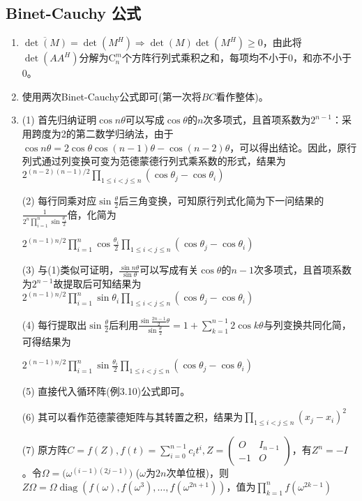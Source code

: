\documentclass[a4paper,UTF8,fontset=windows]{ctexart}
\DeclareMathOperator{\diag}{diag}
\begin{document}
\subsection{Binet-Cauchy 公式}
\begin{enumerate}
\item
$\overline{\det(M)}=\det(M^H)\Rightarrow\det(M)\det(M^H)\ge0$，由此将$\det(AA^H)$分解为$\mathrm{C}_n^m$个方阵行列式乘积之和，每项均不小于0，和亦不小于0。

\item
使用两次Binet-Cauchy公式即可(第一次将$BC$看作整体)。

\item
(1) 首先归纳证明$\cos{n\theta}$可以写成$\cos{\theta}$的$n$次多项式，且首项系数为$2^{n-1}$：采用跨度为2的第二数学归纳法，由于$\cos{n\theta}=2\cos{\theta}\cos{(n-1)\theta}-\cos{(n-2)\theta}$，可以得出结论。因此，原行列式通过列变换可变为范德蒙德行列式乘系数的形式，结果为$2^{(n-2)(n-1)/2}\prod_{1\le i<j\le n}(\cos{\theta_j}-\cos{\theta_i})$

(2) 每行同乘对应$\sin{\frac{\theta}{2}}$后三角变换，可知原行列式化简为下一问结果的$\frac{1}{2^n\prod_{i=1}^{n}\sin{\frac{\theta_i}{2}}}$倍，化简为

$2^{(n-1)n/2}\prod_{i=1}^{n}\cos{\frac{\theta_i}{2}}\prod_{1\le i<j\le n}(\cos{\theta_j}-\cos{\theta_i})$

(3) 与(1)类似可证明，$\frac{\sin{n\theta}}{\sin{\theta}}$可以写成有关$\cos{\theta}$的$n-1$次多项式，且首项系数为$2^{n-1}$故提取后可知结果为$2^{(n-1)n/2}\prod_{i=1}^{n}\sin{\theta_i}\prod_{1\le i<j\le n}(\cos{\theta_j}-\cos{\theta_i})$

(4) 每行提取出$\sin{\frac{\theta}{2}}$后利用$\frac{\sin{\frac{2n-1}{2}\theta}}{\sin{\frac{\theta}{2}}}=1+\sum_{k=1}^{n-1}{2\cos{k\theta}}$与列变换共同化简，可得结果为

$2^{(n-1)n/2}\prod_{i=1}^{n}\sin{\frac{\theta_i}{2}}\prod_{1\le i<j\le n}(\cos{\theta_j}-\cos{\theta_i})$

(5) 直接代入循环阵(例3.10)公式即可。

(6) 其可以看作范德蒙德矩阵与其转置之积，结果为$\prod_{1\le i<j\le n}(x_j-x_i)^2$

(7) 原方阵$C=f(Z),f(t)=\sum_{i=0}^{n-1}c_it^i,Z=\begin{pmatrix}O&I_{n-1}\\-1&O\end{pmatrix}$，有$Z^n=-I$。令$\Omega=\big(\omega^{(i-1)(2j-1)}\big)$ ($\omega$为$2n$次单位根)，则$Z\Omega=\Omega\diag(f(\omega),f(\omega^3),\dots,f(\omega^{2n+1}))$，值为$\prod_{k=1}^{n}f(\omega^{2k-1})$


\end{enumerate}
\end{document}
